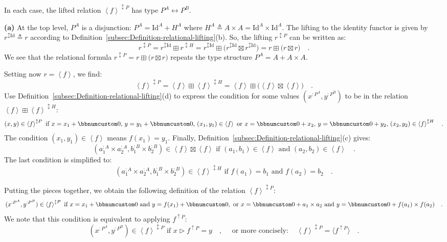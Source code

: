 In each case, the lifted relation $\left<f\right>^{\updownarrow P}$
has type $P^{A}\leftrightarrow P^{B}$.

\textbf{(a)} At the top level, $P^{A}$ is a disjunction: $P^{A}=\text{Id}^{A}+H^{A}$
where $H^{A}\triangleq A\times A=\text{Id}^{A}\times\text{Id}^{A}$.
The lifting to the identity functor is given by $r^{\updownarrow\text{Id}}\triangleq r$
according to Definition~\ref{subsec:Definition-relational-lifting}(b).
So, the lifting $r^{\updownarrow P}$ can be written as:
\[
r^{\updownarrow P}=r^{\updownarrow\text{Id}}\boxplus r^{\updownarrow H}=r^{\updownarrow\text{Id}}\boxplus\big(r^{\updownarrow\text{Id}}\boxtimes r^{\updownarrow\text{Id}}\big)=r\boxplus\big(r\boxtimes r\big)\quad.
\]
We see that the relational formula $r^{\updownarrow P}=r\boxplus\big(r\boxtimes r\big)$
repeats the type structure $P^{A}=A+A\times A$.

Setting now $r=\left<f\right>$, we find:
\[
\left<f\right>^{\updownarrow P}=\left<f\right>\boxplus\left<f\right>^{\updownarrow H}=\left<f\right>\boxplus\big(\left<f\right>\boxtimes\left<f\right>\big)\quad.
\]
Use Definition~\ref{subsec:Definition-relational-lifting}(d) to
express the condition for some values $(x^{:P^{A}},y^{:P^{B}})$ to
be in the relation $\left<f\right>\boxplus\left<f\right>^{\updownarrow H}$:
\[
(x,y)\in\left<f\right>^{\updownarrow P}\text{ if }x=x_{1}+\bbnum 0,\,y=y_{1}+\bbnum 0,\,(x_{1},y_{1})\in\left<f\right>\text{ or }x=\bbnum 0+x_{2},\,y=\bbnum 0+y_{2},\,(x_{2},y_{2})\in\left<f\right>^{\updownarrow H}\quad.
\]
The condition $(x_{1},y_{1})\in\left<f\right>$ means $f(x_{1})=y_{1}$.
Finally, Definition~\ref{subsec:Definition-relational-lifting}(c)
gives:
\[
(a_{1}^{:A}\times a_{2}^{:A},b_{1}^{:B}\times b_{2}^{:B})\in\left<f\right>\boxtimes\left<f\right>\text{ if }(a_{1},b_{1})\in\left<f\right>\text{ and }(a_{2},b_{2})\in\left<f\right>\quad.
\]
The last condition is simplified to:
\[
(a_{1}^{:A}\times a_{2}^{:A},b_{1}^{:B}\times b_{2}^{:B})\in\left<f\right>^{\updownarrow H}\text{ if }f(a_{1})=b_{1}\text{ and }f(a_{2})=b_{2}\quad.
\]

Putting the pieces together, we obtain the following definition of
the relation $\left<f\right>^{\updownarrow P}$:
\[
(x^{:P^{A}},y^{:P^{B}})\in\left<f\right>^{\updownarrow P}\text{ if }x=x_{1}+\bbnum 0\text{ and }y=f(x_{1})+\bbnum 0,\text{ or }x=\bbnum 0+a_{1}\times a_{2}\text{ and }y=\bbnum 0+f(a_{1})\times f(a_{2})\quad.
\]
We note that this condition is equivalent to applying $f^{\uparrow P}$:
\[
(x^{:P^{A}},y^{:P^{B}})\in\left<f\right>^{\updownarrow P}\text{ if }x\triangleright f^{\uparrow P}=y\quad,\quad\text{ or more concisely}:\quad\left<f\right>^{\updownarrow P}=\langle f^{\uparrow P}\rangle\quad.
\]

